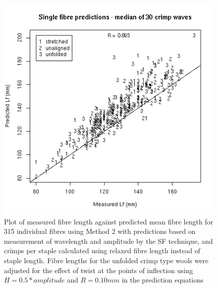 %

\begin{figure}[!h]
  \centering
  \includegraphics[width=1.1\textwidth]{figsfpredlffibre.png}
  \caption{Plot of measured fibre length against predicted mean fibre length for 315 individual fibres using Method 2 with predictions based on measurement of wavelength and amplitude by the SF technique, and crimps per staple calculated using relaxed fibre length instead of staple length. Fibre lengths for the unfolded crimp type wools were adjusted for the effect of twist at the points of inflection using $H = 0.5 * amplitude$ and $R = 0.10 mm$ in the prediction equations }
  \label{fig:sfpredlffibre}
\end{figure}

%


